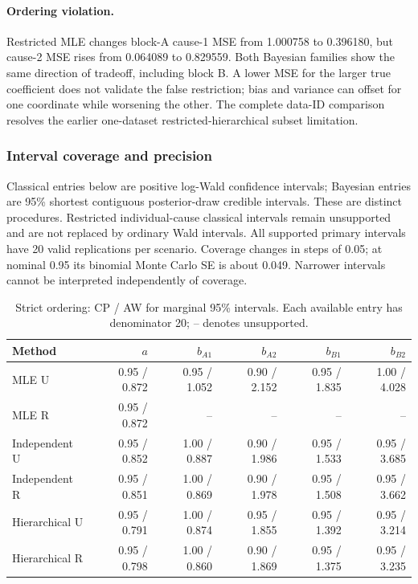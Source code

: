\paragraph{Ordering violation.} Restricted MLE changes block-A cause-1 MSE from 1.000758 to 0.396180, but cause-2 MSE rises from 0.064089 to 0.829559. Both Bayesian families show the same direction of tradeoff, including block B. A lower MSE for the larger true coefficient does not validate the false restriction; bias and variance can offset for one coordinate while worsening the other. The complete data-ID comparison resolves the earlier one-dataset restricted-hierarchical subset limitation.

\subsubsection*{Interval coverage and precision}

Classical entries below are positive log-Wald confidence intervals; Bayesian entries are 95\% shortest contiguous posterior-draw credible intervals. These are distinct procedures. Restricted individual-cause classical intervals remain unsupported and are not replaced by ordinary Wald intervals. All supported primary intervals have 20 valid replications per scenario. Coverage changes in steps of 0.05; at nominal 0.95 its binomial Monte Carlo SE is about 0.049. Narrower intervals cannot be interpreted independently of coverage.

\begin{table}[htbp]\centering\scriptsize

\caption{Strict ordering: CP / AW for marginal 95\% intervals. Each available entry has denominator 20; -- denotes unsupported.}

\begin{tabular}{lrrrrr}\hline Method & $a$ & $b_{A1}$ & $b_{A2}$ & $b_{B1}$ & $b_{B2}$\\\hline

MLE U & 0.95 / 0.872 & 0.95 / 1.052 & 0.90 / 2.152 & 0.95 / 1.835 & 1.00 / 4.028\\

MLE R & 0.95 / 0.872 & -- & -- & -- & --\\

Independent U & 0.95 / 0.852 & 1.00 / 0.887 & 0.90 / 1.986 & 0.95 / 1.533 & 0.95 / 3.685\\

Independent R & 0.95 / 0.851 & 1.00 / 0.869 & 0.90 / 1.978 & 0.95 / 1.508 & 0.95 / 3.662\\

Hierarchical U & 0.95 / 0.791 & 1.00 / 0.874 & 0.95 / 1.855 & 0.95 / 1.392 & 0.95 / 3.214\\

Hierarchical R & 0.95 / 0.798 & 1.00 / 0.860 & 0.90 / 1.869 & 0.95 / 1.375 & 0.95 / 3.235\\

\hline\end{tabular}\end{table}

